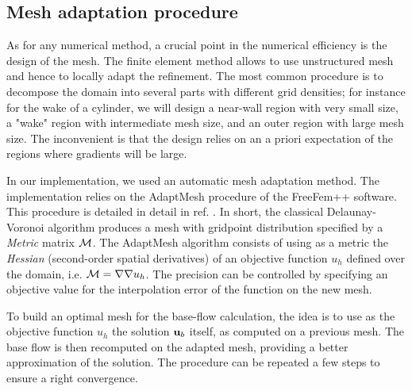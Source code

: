 \documentclass[twocolumn,10pt]{asme2ej}
\begin{document}
\subsection{Mesh adaptation procedure}
\vspace{.2cm}

As for any numerical method, a crucial point in the numerical efficiency is the design of the mesh. The finite element method allows to use unstructured mesh and hence to locally adapt the refinement. %
The most common procedure is to decompose the domain into several parts with different grid densities; for instance for the wake of a cylinder, we will design a near-wall region with very small  size, a "wake" region with intermediate mesh size, and an outer region with large mesh size. The inconvenient is that the design relies on an a priori expectation of the regions where gradients will be large. 

In our implementation, we used an automatic mesh adaptation method. %
The implementation relies on the AdaptMesh procedure of the FreeFem++ software. This procedure is detailed in detail in ref. \cite{adapt}. 
In short, the classical Delaunay-Voronoi algorithm produces a mesh with gridpoint distribution specified by a {\em Metric } matrix $\cal M$. The AdaptMesh algorithm consists of using as a metric the {\em Hessian} (second-order spatial derivatives) of an objective function $u_h$ defined over the domain, i.e. ${\cal M} = \nabla \nabla u_h$. The precision can be controlled by specifying an objective value for the interpolation error of the function on the new mesh.

To build an optimal mesh for the base-flow calculation, the idea is to use as the objective function $u_h$ the solution ${\bf u}_b$ itself, as computed on a previous mesh.%
The base flow is then recomputed on the adapted mesh, providing a better approximation of the solution. The procedure can be repeated a few steps to ensure a right convergence.
\end{document}
